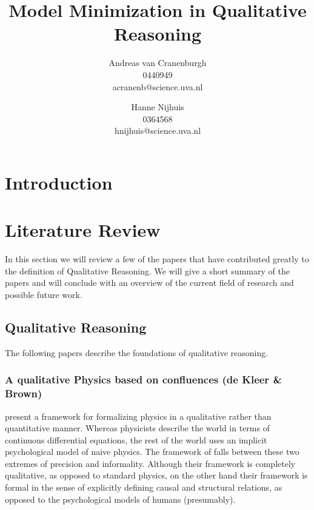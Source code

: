\documentclass{article} %
\title{Model Minimization in Qualitative Reasoning}
\author{Andreas van Cranenburgh \\ 0440949 \\ acranenb@science.uva.nl 
\and Hanne Nijhuis \\ 0364568 \\ hnijhuis@science.uva.nl}
\begin{document}
\maketitle


\newpage

\tableofcontents

\newpage

\section{Introduction}

\section{Literature Review}

In this section we will review a few of the papers that have contributed
greatly to the definition of Qualitative Reasoning. We will give a short
summary of the papers and will conclude with an overview of the current field
of research and possible future work.

\subsection{Qualitative Reasoning}

The following papers describe the foundations of qualitative reasoning.

\subsubsection{A qualitative Physics based on confluences (de Kleer \& Brown)}

\cite{kleer} present a framework for formalizing physics in a qualitative
rather than quantitative manner. Whereas physicists describe the world in
terms of continuous differential equations, the rest of the world uses an
implicit psychological model of naive physics. The framework of \cite{kleer}
falls between these two extremes of precision and informality. Although their
framework is completely qualitative, as opposed to standard physics, on the
other hand their framework is formal in the sense of explicitly defining
causal and structural relations, as opposed to the psychological models of
humans (presumably).
\end{document}

